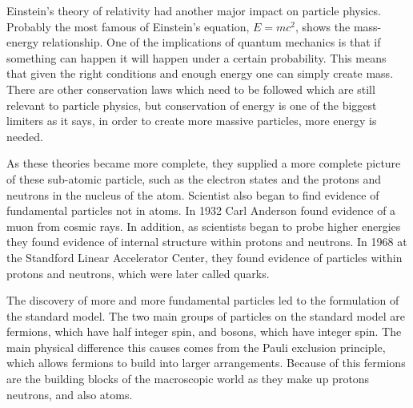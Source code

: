 Einstein's theory of relativity had another major impact on particle physics. Probably the most famous of Einstein's equation, $E = mc^2$, shows the mass-energy relationship. One of the implications of quantum mechanics is that if something can happen it will happen under a certain probability. This means that given the right conditions and enough energy one can simply create mass. There are other conservation laws which need to be followed which are still relevant to particle physics, but conservation of energy is one of the biggest limiters as it says, in order to create more massive particles, more energy is needed. 

As these theories became more complete, they supplied a more complete picture of these sub-atomic particle, such as the electron states and the protons and neutrons in the nucleus of the atom. Scientist also began to find evidence of fundamental particles not in atoms. In 1932 Carl Anderson found evidence of a muon from cosmic rays. In addition, as scientists began to probe higher energies they found evidence of internal structure within protons and neutrons. In 1968 at the Standford Linear Accelerator Center, they found evidence of particles within protons and neutrons, which were later called quarks.

The discovery of more and more fundamental particles led to the formulation of the standard model. The two main groups of particles on the standard model are fermions, which have half integer spin, and bosons, which have integer spin. The main physical difference this causes comes from the Pauli exclusion principle, which allows fermions to build into larger arrangements. Because of this fermions are the building blocks of the macroscopic world as they make up protons neutrons, and also atoms.   

